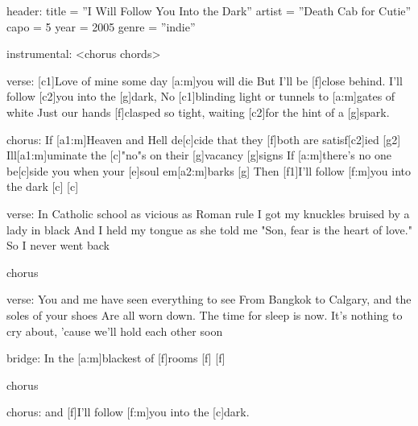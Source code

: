 
header:
    title = ''I Will Follow You Into the Dark''
    artist = ''Death Cab for Cutie''
    capo = 5
    year = 2005
    genre = ''indie''

instrumental:
    <chorus chords>

verse:
    [c1]Love of mine some day [a:m]you will die
    But I'll be [f]close behind. I'll follow [c2]you into the [g]dark,
    No [c1]blinding light or tunnels to [a:m]gates of white
    Just our hands [f]clasped so tight, waiting [c2]for the hint of a [g]spark.
    
chorus:
    If [a1:m]Heaven and Hell de[c]cide that they [f]both are satisf[c2]ied [g2]
    Ill[a1:m]uminate the [c]"no"s on their [g]vacancy [g]signs
    If [a:m]there's no one be[c]side you when your [e]soul em[a2:m]barks [g]
    Then [f1]I'll follow [f:m]you into the dark [c] [c]

verse:
    In Catholic school as vicious as Roman rule
    I got my knuckles bruised by a lady in black
    And I held my tongue as she told me
    "Son, fear is the heart of love." So I never went back

chorus

verse:
    You and me have seen everything to see
    From Bangkok to Calgary, and the soles of your shoes 
    Are all worn down. The time for sleep is now.
    It's nothing to cry about, 'cause we'll hold each other soon

bridge:
    In the [a:m]blackest of [f]rooms [f] [f]

chorus

chorus:
    and [f]I’ll follow [f:m]you into the [c]dark.
